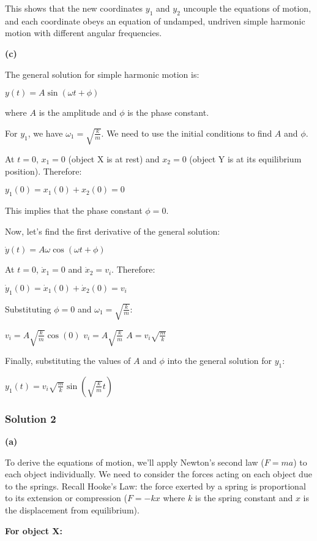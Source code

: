 \documentclass{article}
\begin{document}
This shows that the new coordinates $y_1$ and $y_2$ uncouple the equations of motion, and each coordinate obeys an equation of undamped, undriven simple harmonic motion with different angular frequencies.

\textbf{(c)}

The general solution for simple harmonic motion is:

$y(t) = A\sin(\omega t + \phi)$

where $A$ is the amplitude and $\phi$ is the phase constant.

For $y_1$, we have $\omega_1 = \sqrt{\frac{k}{m}}$.  We need to use the initial conditions to find $A$ and $\phi$.

At $t=0$, $x_1 = 0$ (object X is at rest) and $x_2 = 0$ (object Y is at its equilibrium position). Therefore:

$y_1(0) = x_1(0) + x_2(0) = 0$

This implies that the phase constant $\phi = 0$.

Now, let's find the first derivative of the general solution:

$\dot{y}(t) = A\omega \cos(\omega t + \phi)$

At $t=0$, $\dot{x}_1 = 0$ and $\dot{x}_2 = v_i$.  Therefore:

$\dot{y}_1(0) = \dot{x}_1(0) + \dot{x}_2(0) = v_i$

Substituting $\phi = 0$ and $\omega_1 = \sqrt{\frac{k}{m}}$:

$v_i = A \sqrt{\frac{k}{m}} \cos(0)$
$v_i = A \sqrt{\frac{k}{m}}$
$A = v_i \sqrt{\frac{m}{k}}$

Finally, substituting the values of $A$ and $\phi$ into the general solution for $y_1$:

$y_1(t) = v_i \sqrt{\frac{m}{k}} \sin\left(\sqrt{\frac{k}{m}}t\right)$

\subsubsection{Solution 2}
\textbf{(a)}

To derive the equations of motion, we'll apply Newton's second law ($F = ma$) to each object individually.  We need to consider the forces acting on each object due to the springs. Recall Hooke's Law: the force exerted by a spring is proportional to its extension or compression ($F = -kx$ where $k$ is the spring constant and $x$ is the displacement from equilibrium).

\textbf{For object X:}
\end{document}
